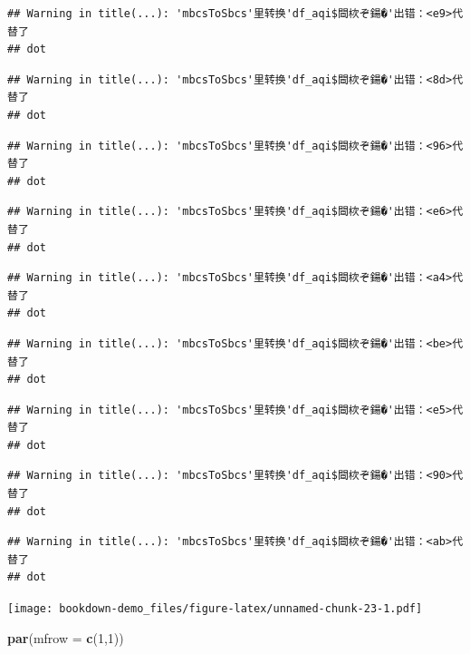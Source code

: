 \documentclass[]{book}
\newenvironment{Shaded}{\begin{snugshade}}{\end{snugshade}}
\newcommand{\DataTypeTok}[1]{\textcolor[rgb]{0.13,0.29,0.53}{#1}}
\newcommand{\DecValTok}[1]{\textcolor[rgb]{0.00,0.00,0.81}{#1}}
\newcommand{\KeywordTok}[1]{\textcolor[rgb]{0.13,0.29,0.53}{\textbf{#1}}}
\newcommand{\NormalTok}[1]{#1}
\begin{document}
\begin{verbatim}
## Warning in title(...): 'mbcsToSbcs'里转换'df_aqi$閸栨ぞ鍚�'出错：<e9>代替了
## dot
\end{verbatim}

\begin{verbatim}
## Warning in title(...): 'mbcsToSbcs'里转换'df_aqi$閸栨ぞ鍚�'出错：<8d>代替了
## dot
\end{verbatim}

\begin{verbatim}
## Warning in title(...): 'mbcsToSbcs'里转换'df_aqi$閸栨ぞ鍚�'出错：<96>代替了
## dot
\end{verbatim}

\begin{verbatim}
## Warning in title(...): 'mbcsToSbcs'里转换'df_aqi$閸栨ぞ鍚�'出错：<e6>代替了
## dot
\end{verbatim}

\begin{verbatim}
## Warning in title(...): 'mbcsToSbcs'里转换'df_aqi$閸栨ぞ鍚�'出错：<a4>代替了
## dot
\end{verbatim}

\begin{verbatim}
## Warning in title(...): 'mbcsToSbcs'里转换'df_aqi$閸栨ぞ鍚�'出错：<be>代替了
## dot
\end{verbatim}

\begin{verbatim}
## Warning in title(...): 'mbcsToSbcs'里转换'df_aqi$閸栨ぞ鍚�'出错：<e5>代替了
## dot
\end{verbatim}

\begin{verbatim}
## Warning in title(...): 'mbcsToSbcs'里转换'df_aqi$閸栨ぞ鍚�'出错：<90>代替了
## dot
\end{verbatim}

\begin{verbatim}
## Warning in title(...): 'mbcsToSbcs'里转换'df_aqi$閸栨ぞ鍚�'出错：<ab>代替了
## dot
\end{verbatim}

\texttt{[image: bookdown-demo\_files/figure-latex/unnamed-chunk-23-1.pdf]}

\begin{Shaded}
\begin{Highlighting}[]
\KeywordTok{par}\NormalTok{(}\DataTypeTok{mfrow =} \KeywordTok{c}\NormalTok{(}\DecValTok{1}\NormalTok{,}\DecValTok{1}\NormalTok{))}
\end{Highlighting}
\end{Shaded}
\end{document}

